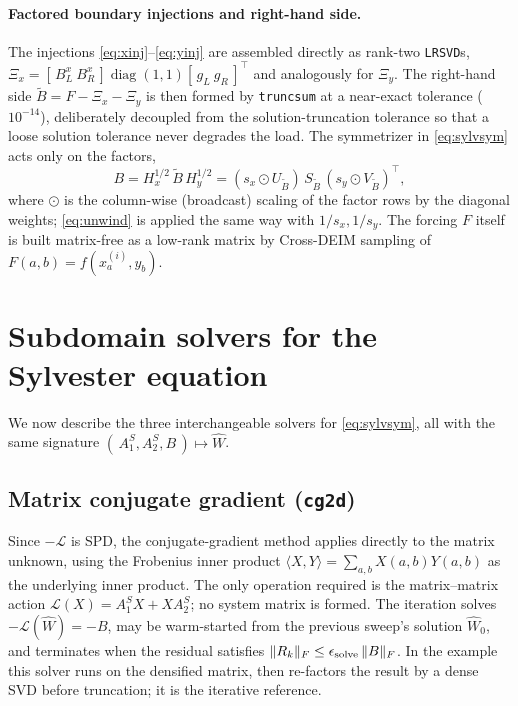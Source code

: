 \documentclass[hidelinks,onefignum,onetabnum]{siamart250211}
\newcommand{\Hx}{H_x}
\newcommand{\Hy}{H_y}
\newcommand{\AoneS}{A_1^{S}}
\newcommand{\AtwoS}{A_2^{S}}
\newcommand{\What}{\widehat{W}}
\newcommand{\Lop}{\mathcal{L}}
\newcommand{\fro}[1]{\lVert #1 \rVert_{F}}
\begin{document}
\paragraph{Factored boundary injections and right-hand side.}  The injections
\cref{eq:xinj}--\cref{eq:yinj} are assembled directly as rank-two
{\tt LRSVD}s, $\Xi_x = [\,B_L^{x}\ B_R^{x}\,]\operatorname{diag}(1,1)
[\,g_L\ g_R\,]^{\!\top}$ and analogously for $\Xi_y$.  The right-hand side
$\widetilde{B}=F-\Xi_x-\Xi_y$ is then formed by {\tt truncsum} at a near-exact
tolerance ($10^{-14}$), deliberately decoupled from the solution-truncation
tolerance so that a loose solution tolerance never degrades the load.  The
symmetrizer in \cref{eq:sylvsym} acts only on the factors,
\begin{equation}
\label{eq:symfactors}
B = \Hx^{1/2}\,\widetilde{B}\,\Hy^{1/2}
  = (s_x \odot U_{\widetilde B})\, S_{\widetilde B}\, (s_y \odot V_{\widetilde B})^{\!\top},
\end{equation}
where $\odot$ is the column-wise (broadcast) scaling of the factor rows by the
diagonal weights; \cref{eq:unwind} is applied the same way with $1/s_x, 1/s_y$.
The forcing $F$ itself is built matrix-free as a low-rank matrix by Cross-DEIM
sampling of $F(a,b)=f(x^{(i)}_a,y_b)$.

\section{Subdomain solvers for the Sylvester equation}
\label{sec:solvers}
We now describe the three interchangeable solvers for \cref{eq:sylvsym}, all with
the same signature $(\,\AoneS,\AtwoS,B\,)\mapsto\What$.

\subsection{Matrix conjugate gradient ({\tt cg2d})}
Since $-\Lop$ is SPD, the conjugate-gradient method applies directly to the
matrix unknown, using the Frobenius inner product
$\langle X,Y\rangle = \sum_{a,b} X(a,b)Y(a,b)$ as the underlying inner product.
The only operation required is the matrix--matrix action
$\Lop(X) = \AoneS X + X\AtwoS$; no system matrix is formed.  The iteration solves
$-\Lop(\What) = -B$, may be warm-started from the previous sweep's solution
$\What_0$, and terminates when the residual satisfies
$\fro{R_k}\le \epsilon_{\rm solve}\,\fro{B}$.  In the example this solver runs on
the densified matrix, then re-factors the result by a dense SVD before
truncation; it is the iterative reference.
\end{document}
